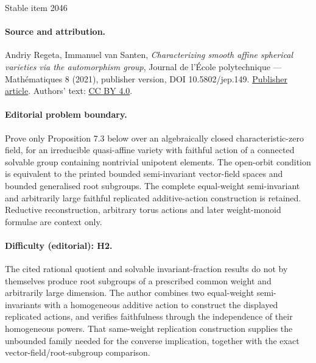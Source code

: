 \documentclass[11pt]{article}
\numberwithin{equation}{section}
\begin{document}
\begin{center}{\Large Stable item 2046}\end{center}
\paragraph{Source and attribution.}
Andriy Regeta, Immanuel van Santen, \emph{Characterizing smooth affine spherical varieties via the automorphism group}, Journal de l’École polytechnique — Mathématiques 8 (2021), publisher version, DOI 10.5802/jep.149. \href{https://jep.centre-mersenne.org/articles/10.5802/jep.149/}{Publisher article}. Authors' text: \href{https://creativecommons.org/licenses/by/4.0/}{CC BY 4.0}.
\paragraph{Editorial problem boundary.}
Prove only Proposition 7.3 below over an algebraically closed characteristic-zero field, for an irreducible quasi-affine variety with faithful action of a connected solvable group containing nontrivial unipotent elements. The open-orbit condition is equivalent to the printed bounded semi-invariant vector-field spaces and bounded generalised root subgroups. The complete equal-weight semi-invariant and arbitrarily large faithful replicated additive-action construction is retained. Reductive reconstruction, arbitrary torus actions and later weight-monoid formulae are context only.
\paragraph{Difficulty (editorial): H2.}
The cited rational quotient and solvable invariant-fraction results do not by themselves produce root subgroups of a prescribed common weight and arbitrarily large dimension. The author combines two equal-weight semi-invariants with a homogeneous additive action to construct the displayed replicated actions, and verifies faithfulness through the independence of their homogeneous powers. That same-weight replication construction supplies the unbounded family needed for the converse implication, together with the exact vector-field/root-subgroup comparison.
\end{document}
